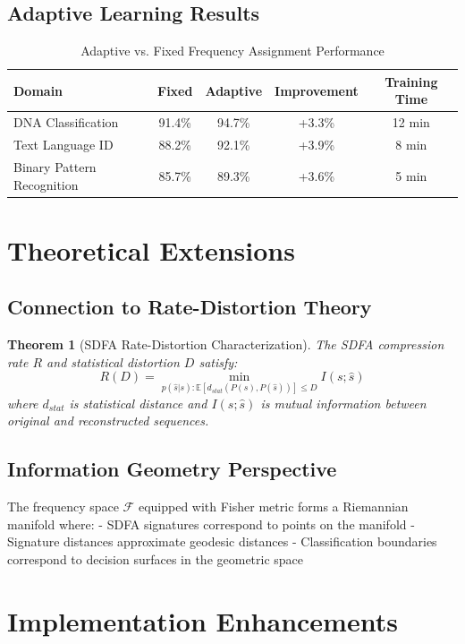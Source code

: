 \documentclass[11pt]{article}
\newtheorem{theorem}{Theorem}
\begin{document}
\subsection{Adaptive Learning Results}

\begin{table}[h]
\centering
\caption{Adaptive vs. Fixed Frequency Assignment Performance}
\begin{tabular}{lcccc}
\toprule
\textbf{Domain} & \textbf{Fixed} & \textbf{Adaptive} & \textbf{Improvement} & \textbf{Training Time} \\
\midrule
DNA Classification & 91.4\% & 94.7\% & +3.3\% & 12 min \\
Text Language ID & 88.2\% & 92.1\% & +3.9\% & 8 min \\
Binary Pattern Recognition & 85.7\% & 89.3\% & +3.6\% & 5 min \\
\bottomrule
\end{tabular}
\end{table}

\section{Theoretical Extensions}

\subsection{Connection to Rate-Distortion Theory}

\begin{theorem}[SDFA Rate-Distortion Characterization]
The SDFA compression rate $R$ and statistical distortion $D$ satisfy:
\[R(D) = \min_{p(\hat{s}|s): \mathbb{E}[d_{stat}(P(s), P(\hat{s}))] \leq D} I(s; \hat{s})\]
where $d_{stat}$ is statistical distance and $I(s; \hat{s})$ is mutual information between original and reconstructed sequences.
\end{theorem}

\subsection{Information Geometry Perspective}

The frequency space $\mathcal{F}$ equipped with Fisher metric forms a Riemannian manifold where:
- SDFA signatures correspond to points on the manifold
- Signature distances approximate geodesic distances
- Classification boundaries correspond to decision surfaces in the geometric space

\section{Implementation Enhancements}
\end{document}
